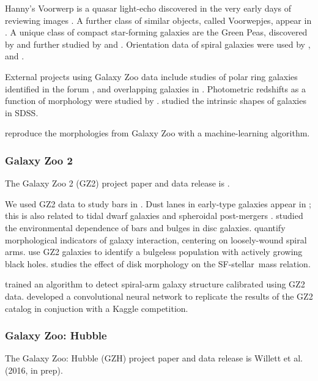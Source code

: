 \documentclass[twocolumn]{aastex6}
\begin{document}
Hanny's Voorwerp is a quasar light-echo discovered in the very early days of reviewing images \citep{lin09,joz09,ram10,sch10,kee12}. A further class of similar objects, called Voorwepjes, appear in \citet{kee12b,kee15}. A unique class of compact star-forming galaxies are the Green Peas, discovered by \citep{car09} and further studied by \citet{amo10,cha12} and \citet{haw12}. Orientation data of spiral galaxies were used by \citet{lan08}, \citet{slo09} and \citet{jim10}. 

External projects using Galaxy Zoo data include studies of polar ring galaxies identified in the forum \citep{fin12}, and overlapping galaxies in \citet{kee13,kee14}. Photometric redshifts as a function of morphology were studied by \citet{way11}. \citet{rod13} studied the intrinsic shapes of galaxies in SDSS.

\citet{ban10} reproduce the morphologies from Galaxy Zoo with a machine-learning algorithm. 

\subsubsection{Galaxy Zoo 2}

The Galaxy Zoo 2 (GZ2) project paper and data release is \citet{wil13}.

We used GZ2 data to study bars in \citet{hoy11,mas11c,mas12a,che13,gal15}. Dust lanes in early-type galaxies appear in \citet{kav12a,sha12b}; this is also related to tidal dwarf galaxies \citep{kav12} and spheroidal post-mergers \citep{car12,kav13a}. \citet{ski12} studied the environmental dependence of bars and bulges in disc galaxies. \citet{cas13} quantify morphological indicators of galaxy interaction, centering on loosely-wound spiral arms. \citet{sim13} use GZ2 galaxies to identify a bulgeless population with actively growing black holes. \citet{wil15} studies the effect of disk morphology on the SF-stellar~mass relation.

\citet{dav12a,dav14} trained an algorithm to detect spiral-arm galaxy structure calibrated using GZ2 data. \citet{die15} developed a convolutional neural network to replicate the results of the GZ2 catalog in conjuction with a Kaggle competition.

\subsubsection{Galaxy Zoo: Hubble}

The Galaxy Zoo: Hubble (GZH) project paper and data release is Willett et al. (2016, in prep).
\end{document}
